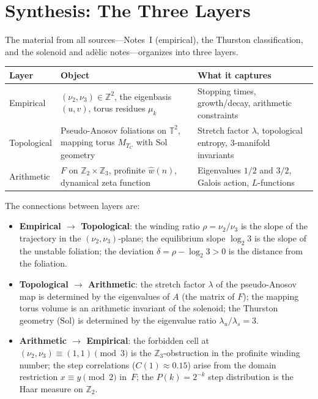 \documentclass[11pt,a4paper]{article}
\newcommand{\Z}{\mathbb{Z}}
\newcommand{\T}{\mathbb{T}}
\newcommand{\Sol}{\mathrm{Sol}}
\theoremstyle{plain}
\theoremstyle{definition}
\begin{document}
\section{Synthesis: The Three Layers}\label{sec:synthesis}

The material from all sources---Notes~I (empirical), the Thurston classification, and the solenoid and ad\`elic notes---organizes into three layers.

\smallskip

\begin{center}
\renewcommand{\arraystretch}{1.4}
\small
\begin{tabular}{lp{3.8cm}p{4.8cm}}
    \toprule
    \textbf{Layer} & \textbf{Object} & \textbf{What it captures} \\
    \midrule
    Empirical & $(\nu_2, \nu_3) \in \Z^2$, the eigenbasis $(u, v)$, torus residues $\mu_k$ & Stopping times, growth/decay, arithmetic constraints \\[6pt]
    Topological & Pseudo-Anosov foliations on $\T^2$, mapping torus $M_{T_C}$ with $\Sol$ geometry & Stretch factor $\lambda$, topological entropy, 3-manifold invariants \\[6pt]
    Arithmetic & $F$ on $\Z_2 \times \Z_3$, profinite $\hat{w}(n)$, dynamical zeta function & Eigenvalues $1/2$ and $3/2$, Galois action, $L$-functions \\
    \bottomrule
\end{tabular}
\end{center}

The connections between layers are:
\begin{itemize}
    \item \textbf{Empirical $\to$ Topological}: the winding ratio $\rho = \nu_2/\nu_3$ is the slope of the trajectory in the $(\nu_2, \nu_3)$-plane; the equilibrium slope $\log_2 3$ is the slope of the unstable foliation; the deviation $\delta = \rho - \log_2 3 > 0$ is the distance from the foliation.

    \item \textbf{Topological $\to$ Arithmetic}: the stretch factor $\lambda$ of the pseudo-Anosov map is determined by the eigenvalues of $A$ (the matrix of $F$); the mapping torus volume is an arithmetic invariant of the solenoid; the Thurston geometry ($\Sol$) is determined by the eigenvalue ratio $\lambda_u / \lambda_s = 3$.

    \item \textbf{Arithmetic $\to$ Empirical}: the forbidden cell at $(\nu_2, \nu_3) \equiv (1,1) \pmod{3}$ is the $\Z_3$-obstruction in the profinite winding number; the step correlations ($C(1) \approx 0.15$) arise from the domain restriction $x \equiv y \pmod{2}$ in~$F$; the $P(k) = 2^{-k}$ step distribution is the Haar measure on $\Z_2$.
\end{itemize}
\end{document}
